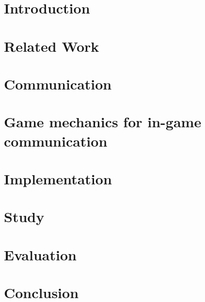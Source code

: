 \section{Introduction}
\label{section:Introduction}



\section{Related Work}
\label{section:Related Work}



\section{Communication}
\label{section:Communication}



\section{Game mechanics for in-game communication}
\label{section:Game mechanics for in-game communication}



\section{Implementation}
\label{section:Implementation}



\newpage
\section{Study}
\label{section:Study}



\section{Evaluation}
\label{section:Evaluation}



\section{Conclusion}
\label{section:Conclusion}
